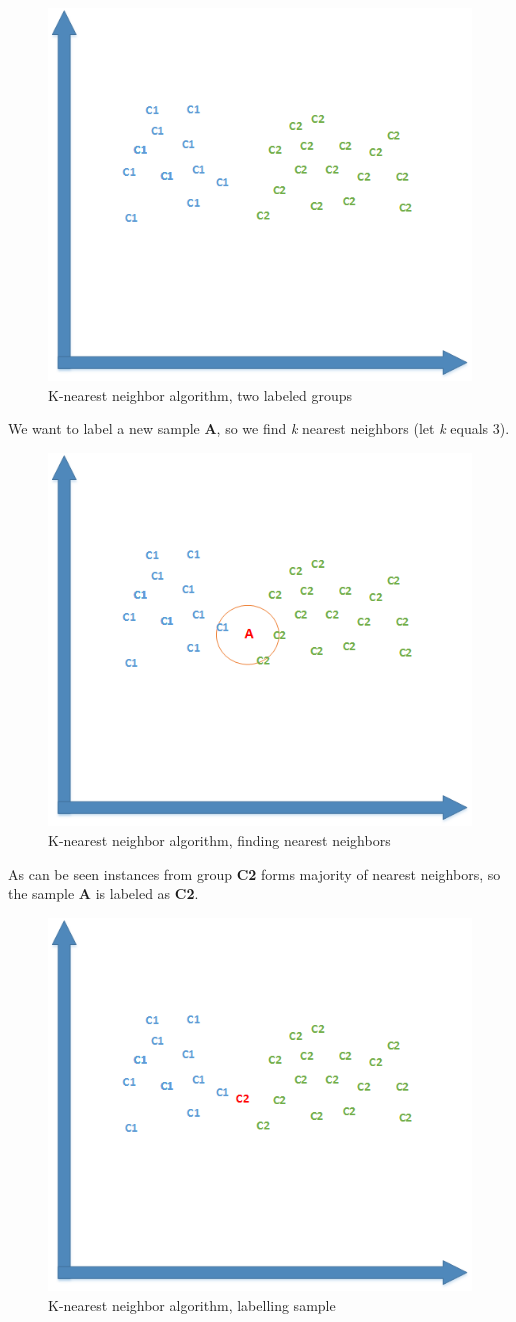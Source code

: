 \begin{itemize}
		\begin{figure}[H]
			\begin{center}
				\includegraphics[width=0.5\linewidth]{images/knn1.png}
				\caption{K-nearest neighbor algorithm, two labeled groups}
				\label{knn1}
			\end{center}
		\end{figure}
		We want to label a new sample \textbf{A}, so we find \textit{k} nearest neighbors (let \textit{k} equals 3).
		\begin{figure}[H]
			\begin{center}
				\includegraphics[width=0.5\linewidth]{images/knn2.png}
				\caption{K-nearest neighbor algorithm, finding nearest neighbors}
				\label{knn2}
			\end{center}
		\end{figure}
		As can be seen instances from group \textbf{C2} forms majority of nearest neighbors, so the sample \textbf{A} is labeled as \textbf{C2}.
		\begin{figure}[H]
			\begin{center}
				\includegraphics[width=0.5\linewidth]{images/knn3.png}
				\caption{K-nearest neighbor algorithm, labelling sample}
				\label{knn3}
			\end{center}
		\end{figure}
		

\end{itemize}
